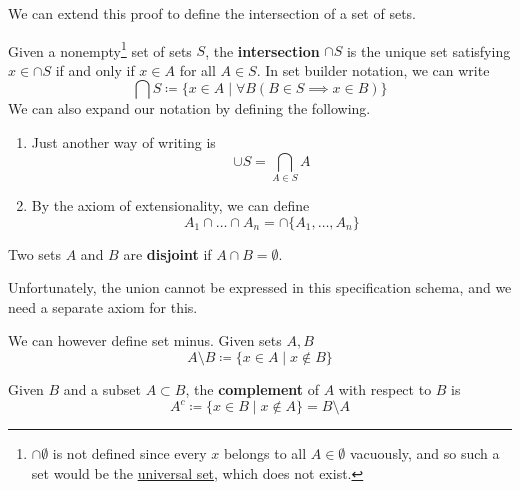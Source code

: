   We can extend this proof to define the intersection of a set of sets. 
  
  \begin{definition}[Intersection]
    \label{def:intersection}
    Given a nonempty\footnote{$\cap \emptyset$ is not defined since every $x$ belongs to all $A \in \emptyset$ vacuously, and so such a set would be the \hyperref[thm:universal-set]{universal set}, which does not exist.} set of sets $S$, the \textbf{intersection} $\cap S$ is the unique set satisfying $x \in \cap S$ if and only if $x \in A$ for all $A \in S$. In set builder notation, we can write 
    \begin{equation}
      \bigcap S \coloneqq \{x \in A \mid \forall B (B \in S \implies x \in B) \}
    \end{equation}
    We can also expand our notation by defining the following. 
    \begin{enumerate}
      \item Just another way of writing is 
        \begin{equation}
          \cup S = \bigcap_{A \in S} A
        \end{equation}

      \item By the axiom of extensionality, we can define 
        \begin{equation}
          A_1 \cap \ldots \cap A_n = \cap \{A_1, \ldots, A_n\}
        \end{equation}
    \end{enumerate}
  \end{definition}

  \begin{definition}
    \label{def:disjoint-sets}
    Two sets $A$ and $B$ are \textbf{disjoint} if $A \cap B = \emptyset$. 
  \end{definition}

  Unfortunately, the union cannot be expressed in this specification schema, and we need a separate axiom for this. 

  \begin{definition}
    \label{def:set-minus}
    We can however define set minus. Given sets $A, B$
    \begin{equation}
      A \setminus B \coloneqq \{ x \in A \mid x \not\in B \}
    \end{equation}
  \end{definition}

  \begin{definition}
    \label{def:set-complement}
    Given $B$ and a subset $A \subset B$, the \textbf{complement} of $A$ with respect to $B$ is 
    \begin{equation}
      A^c \coloneqq \{ x \in B \mid x \not\in A \} = B \setminus A
    \end{equation}
  \end{definition}  

